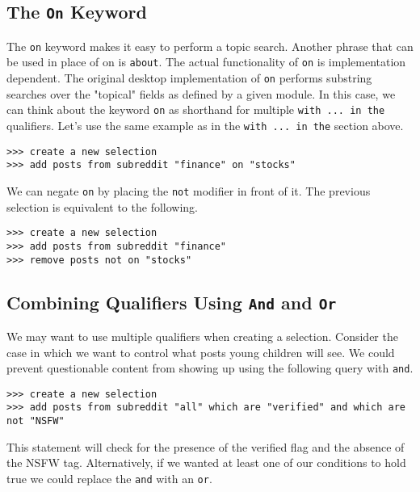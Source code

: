 \subsection{The \texttt{On} Keyword}
The \texttt{on} keyword makes it easy to perform a topic search. Another phrase that can be used in place of on is \texttt{about}. The actual functionality of \texttt{on} is implementation dependent. The original desktop implementation of \texttt{on} performs substring searches over the "topical" fields as defined by a given module. In this case, we can think about the keyword \texttt{on} as shorthand for multiple \texttt{with ... in the} qualifiers. Let’s use the same example as in the  \texttt{with ... in the} section above.
\newline\begin{minipage}{\linewidth}\begin{lstlisting}
>>> create a new selection
>>> add posts from subreddit "finance" on "stocks"
\end{lstlisting}\end{minipage}
We can negate \texttt{on} by placing the \texttt{not} modifier in front of it. The previous selection is equivalent to the following.
\newline\begin{minipage}{\linewidth}\begin{lstlisting}
>>> create a new selection
>>> add posts from subreddit "finance"
>>> remove posts not on "stocks"
\end{lstlisting}\end{minipage}
\subsection{Combining Qualifiers Using \texttt{And} and \texttt{Or}}
We may want to use multiple qualifiers when creating a selection. Consider the case in which we want to control what posts young children will see. We could prevent questionable content from showing up using the following query with \texttt{and}.
\newline\begin{minipage}{\linewidth}\begin{lstlisting}
>>> create a new selection
>>> add posts from subreddit "all" which are "verified" and which are not "NSFW"
\end{lstlisting}\end{minipage}
This statement will check for the presence of the verified flag and the absence of the NSFW tag. Alternatively, if we wanted at least one of our conditions to hold true we could replace the \texttt{and} with an \texttt{or}.


